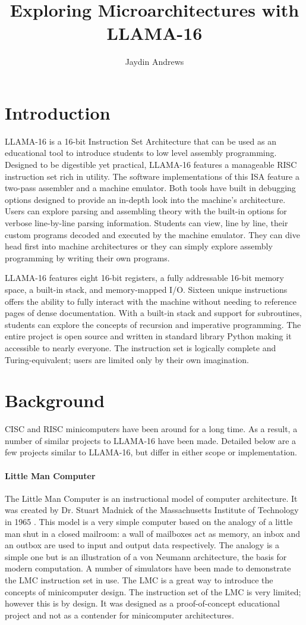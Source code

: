 \documentclass[man,hidelinks,floatsintext]{apa7}
\title{Exploring Microarchitectures with LLAMA-16}
\author{Jaydin Andrews}
\begin{document}
\maketitle
\section{Introduction}
LLAMA-16 is a 16-bit Instruction Set Architecture that can be used as an educational tool to introduce students to low level assembly programming. Designed to be digestible yet practical, LLAMA-16 features a manageable RISC instruction set rich in utility. The software implementations of this ISA feature a two-pass assembler and a machine emulator. Both tools have built in debugging options designed to provide an in-depth look into the machine's architecture. Users can explore parsing and assembling theory with the built-in options for verbose line-by-line parsing information. Students can view, line by line, their custom programs decoded and executed by the machine emulator. They can dive head first into machine architectures or they can simply explore assembly programming by writing their own programs.\par
LLAMA-16 features eight 16-bit registers, a fully addressable 16-bit memory space, a built-in stack, and memory-mapped I/O. Sixteen unique instructions offers the ability to fully interact with the machine without needing to reference pages of dense documentation. With a built-in stack and support for subroutines, students can explore the concepts of recursion and imperative programming. The entire project is open source and written in standard library Python making it accessible to nearly everyone. The instruction set is logically complete and Turing-equivalent; users are limited only by their own imagination.
\section{Background}
CISC and RISC minicomputers have been around for a long time. As a result, a number of similar projects to LLAMA-16 have been made. Detailed below are a few projects similar to LLAMA-16, but differ in either scope or implementation.
\paragraph{Little Man Computer}
The Little Man Computer is an instructional model of computer architecture. It was created by Dr. Stuart Madnick of the Massachusetts Institute of Technology in 1965 \parencite{lmc}. This model is a very simple computer based on the analogy of a little man shut in a closed mailroom: a wall of mailboxes act as memory, an inbox and an outbox are used to input and output data respectively. The analogy is a simple one but is an illustration of a von Neumann architecture, the basis for modern computation. A number of simulators have been made to demonstrate the LMC instruction set in use. The LMC is a great way to introduce the concepts of minicomputer design. The instruction set of the LMC is very limited; however this is by design. It was designed as a proof-of-concept educational project and not as a contender for minicomputer architectures.
\end{document}
